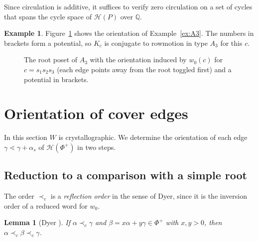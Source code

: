\documentclass[11pt]{amsart}
\newtheorem{lemma}[theorem]{Lemma}
\theoremstyle{definition}
\newtheorem{example}[theorem]{Example}
\newcommand{\pr}{\prec_c}
\newcommand{\Hasse}{\mathcal H}
\begin{document}
Since circulation is additive, it suffices to verify zero circulation on a set of cycles that spans the cycle space of $\Hasse(P)$ over $\mathbb Q$.

\begin{example}\label{ex:A3pot}
Figure~\ref{fig:A3} shows the orientation of Example~\ref{ex:A3}. The numbers in brackets form a potential, so $K_c$ is conjugate to rowmotion in type $A_3$ for this $c$.
\end{example}

\begin{figure}[h]\centering
{}
\caption{The root poset of $A_3$ with the orientation induced by $w_0(c)$ for $c=s_1s_2s_3$ (each edge points away from the root toggled first) and a potential in brackets.}\label{fig:A3}
\end{figure}

\section{Orientation of cover edges}\label{sec:edges}
In this section $W$ is crystallographic. We determine the orientation of each edge $\gamma\lessdot\gamma+\alpha_s$ of $\Hasse(\Phi^+)$ in two steps.

\subsection{Reduction to a comparison with a simple root}
The order $\pr$ is a \emph{reflection order} in the sense of Dyer, since it is the inversion order of a reduced word for $w_0$.

\begin{lemma}[Dyer {\cite[(2.2), (2.13)]{Dyer}}]\label{lem:dyer}
If $\alpha\pr\gamma$ and $\beta=x\alpha+y\gamma\in\Phi^+$ with $x,y>0$, then $\alpha\pr\beta\pr\gamma$.
\end{lemma}
\end{document}
